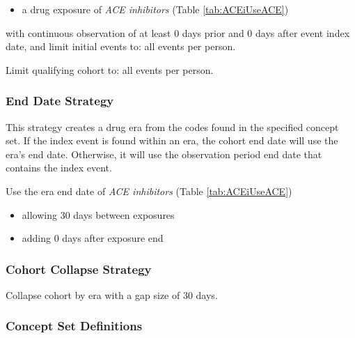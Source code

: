 \documentclass[11pt]{book}
\providecommand{\tightlist}{%
  \setlength{\itemsep}{0pt}\setlength{\parskip}{0pt}}
\theoremstyle{definition}
\theoremstyle{definition}
\theoremstyle{definition}
\theoremstyle{remark}
\begin{document}
\begin{itemize}
\tightlist
\item
  a drug exposure of \emph{ACE inhibitors} (Table \ref{tab:ACEiUseACE})
\end{itemize}

with continuous observation of at least 0 days prior and 0 days after event index date, and limit initial events to: all events per person.

Limit qualifying cohort to: all events per person.

\hypertarget{end-date-strategy-6}{%
\subsubsection*{End Date Strategy}\label{end-date-strategy-6}}

This strategy creates a drug era from the codes found in the specified concept set. If the index event is found within an era, the cohort end date will use the era's end date. Otherwise, it will use the observation period end date that contains the index event.

Use the era end date of \emph{ACE inhibitors} (Table \ref{tab:ACEiUseACE})

\begin{itemize}
\tightlist
\item
  allowing 30 days between exposures
\item
  adding 0 days after exposure end
\end{itemize}

\hypertarget{cohort-collapse-strategy-6}{%
\subsubsection*{Cohort Collapse Strategy}\label{cohort-collapse-strategy-6}}

Collapse cohort by era with a gap size of 30 days.

\hypertarget{concept-set-definitions-6}{%
\subsubsection*{Concept Set Definitions}\label{concept-set-definitions-6}}
\end{document}
